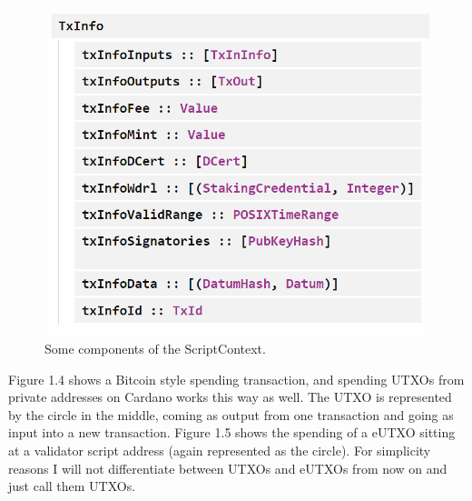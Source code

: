 \documentclass[a4paper,twoside,12pt]{report}
\begin{document}
\begin{figure}[h]
\centering
\includegraphics[scale=0.75]{context_txinfo}
\caption{Some components of the ScriptContext.}
\end{figure}
Figure 1.4 shows a Bitcoin style spending transaction, and spending UTXOs from private addresses on Cardano works this way as well. The UTXO is represented by the circle in the middle, coming as output from one transaction and going as input into a new transaction. Figure 1.5 shows the spending of a eUTXO sitting at a validator script address (again represented as the circle). For simplicity reasons I will not differentiate between UTXOs and eUTXOs from now on and just call them UTXOs.
\end{document}
